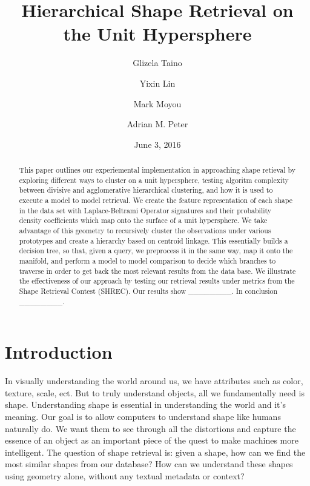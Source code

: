 \documentclass{article}
\begin{document}
\title{Hierarchical Shape Retrieval on the Unit Hypersphere}
\author{Glizela Taino}
\author{Yixin Lin}
\author{Mark Moyou}
\author{Adrian M. Peter}
\setcounter{Maxaffil}{0}
\renewcommand\Affilfont{\itshape\small}
\date{June 3, 2016}
\maketitle

\begin{abstract}
This paper outlines our experiemental implementation in approaching shape retieval by exploring different ways to cluster on a unit hypersphere, testing algoritm complexity between divisive and agglomerative hierarchical clustering, and how it is used to execute a model to model retrieval. We create the feature representation of each shape in the data set with Laplace-Beltrami Operator signatures and their probability density coefficients which map onto the surface of a unit hypersphere. We take advantage of this geometry to recursively cluster the observations under various prototypes and create a hierarchy based on centroid linkage. This essentially builds a decision tree, so that, given a query, we preprocess it in the same way, map it onto the manifold, and perform a model to model comparison to decide which branches to traverse in order to get back the most relevant results from the data base. We illustrate the effectiveness of our approach by testing our retrieval results under metrics from the Shape Retrieval Contest (SHREC). Our results show \_\_\_\_\_\_\_\_. In conclusion \_\_\_\_\_\_\_\_.\end{abstract}

\section*{Introduction}
In visually understanding the world around us, we have attributes such as color, texture, scale, ect. But to truly understand objects, all we fundamentally need is shape. Understanding shape is essential in understanding the world and it's meaning. Our goal is to allow computers to understand shape like humans naturally do. We want them to see through all the distortions and capture the essence of an object as an important piece of the quest to make machines more intelligent. The question of shape retrieval is: given a shape, how can we find the most similar shapes from our database? How can we understand these shapes using geometry alone, without any textual metadata or context? 
\end{document}
